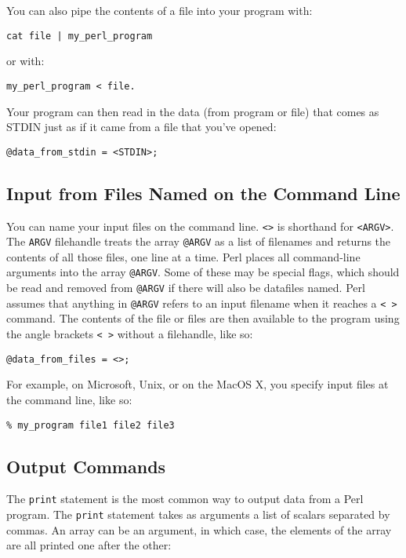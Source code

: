 You can also pipe the contents of a file into your program with:

\begin{lstlisting}
cat file | my_perl_program 
\end{lstlisting}

or with:

\begin{lstlisting}
my_perl_program < file.
\end{lstlisting}

Your program can then read in the data (from program or file) that comes as STDIN just as if it came from a file that you've opened:

\begin{lstlisting}
@data_from_stdin = <STDIN>;
\end{lstlisting}

\subsection{Input from Files Named on the Command Line}
You can name your input files on the command line. \verb|<>| is shorthand for \verb|<ARGV>|. The \verb|ARGV| filehandle treats the array \verb|@ARGV| as a list of filenames and returns the contents of all those files, one line at a time. Perl places all command-line arguments into the array \verb|@ARGV|. Some of these may be special flags, which should be read and removed from \verb|@ARGV| if there will also be datafiles named. Perl assumes that anything in \verb|@ARGV| refers to an input filename when it reaches a \verb|< >| command. The contents of the file or files are then available to the program using the angle brackets \verb|< >| without a filehandle, like so:

\begin{lstlisting}
@data_from_files = <>;
\end{lstlisting}

For example, on Microsoft, Unix, or on the MacOS X, you specify input files at the command line, like so:

\begin{lstlisting}
% my_program file1 file2 file3
\end{lstlisting}

\subsection{Output Commands}
The \verb|print| statement is the most common way to output data from a Perl program. The \verb|print| statement takes as arguments a list of scalars separated by commas. An array can be an argument, in which case, the elements of the array are all printed one after the other:

